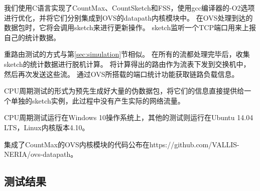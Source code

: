 我们使用C语言实现了CountMax、CountSketch和FSS，使用gcc编译器\cite{gcc}的-O2选项进行优化，并将它们分别集成到OVS的datapath内核模块中。
在OVS处理到达的数据包时，它将会调用sketch来进行更新操作。
sketch监听一个TCP端口用来上报自己的统计数据。

重路由测试的方式与第\ref{sec:simulation}节相似。
在所有的流都处理完毕后，收集sketch的统计数据进行脱机计算。
将计算得出的路由作为流表下发到交换机中，然后再次发送这些流。
通过OVS所搭载的端口统计功能获取链路负载信息。

CPU周期测试的形式为预先生成好大量的伪数据包，将它们的信息直接提供给一个单独的sketch实例，此过程中没有产生实际的网络流量。

CPU周期测试运行在Windows 10操作系统上，其他的测试则运行在Ubuntu 14.04 LTS，Linux内核版本4.10。

集成了CountMax的OVS内核模块的代码公布在https://github.com/VALLIS-NERIA/ovs-datapath。
 
\subsection{测试结果}

